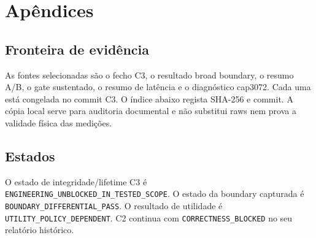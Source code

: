 \clearpage
\section{Apêndices}
\subsection{Fronteira de evidência}
As fontes selecionadas são o fecho C3, o resultado broad boundary, o resumo A/B, o gate sustentado, o resumo de latência e o diagnóstico cap3072. Cada uma está congelada no commit C3. O índice abaixo regista SHA-256 e commit. A cópia local serve para auditoria documental e não substitui raws nem prova a validade física das medições. 
\subsection{Estados}
O estado de integridade/lifetime C3 é \nolinkurl{ENGINEERING_UNBLOCKED_IN_TESTED_SCOPE}. O estado da boundary capturada é \nolinkurl{BOUNDARY_DIFFERENTIAL_PASS}. O resultado de utilidade é \nolinkurl{UTILITY_POLICY_DEPENDENT}. C2 continua com \nolinkurl{CORRECTNESS_BLOCKED} no seu relatório histórico. 
